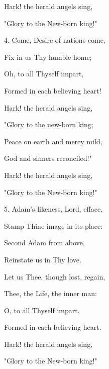 \begin{description}[nosep,leftmargin=\parindent,labelsep=0pt]
\item Hark! the herald angels sing, 
\item "Glory to the New-born king!" 
\vspace{1.5ex}
\item 4. Come, Desire of nations come, 
\item Fix in us Thy humble home; 
\item Oh, to all Thyself impart, 
\item Formed in each believing heart! 
\item Hark! the herald angels sing, 
\item "Glory to the new-born king; 
\item Peace on earth and mercy mild, 
\item God and sinners reconciled!" 
\item Hark! the herald angels sing, 
\item "Glory to the New-born king!" 
\vspace{1.5ex}
\item 5. Adam's likeness, Lord, efface, 
\item Stamp Thine image in its place: 
\item Second Adam from above, 
\item Reinstate us in Thy love. 
\item Let us Thee, though lost, regain, 
\item Thee, the Life, the inner man: 
\item O, to all Thyself impart, 
\item Formed in each believing heart. 
\item Hark! the herald angels sing, 
\item "Glory to the New-born king!" 
\end{description}

